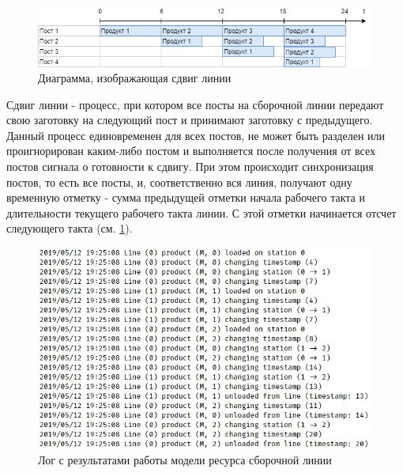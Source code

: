 \begin{figure}[h]
	\includegraphics[width=\linewidth]{pics/assemblyDiagram.png}
	\caption{Диаграмма, изображающая сдвиг линии}
	\label{fig:lineDiagram}
\end{figure}

\indent Сдвиг линии - процесс, при котором все посты на сборочной линии передают свою заготовку на следующий пост и принимают заготовку с предыдущего.
Данный процесс единовременен для всех постов, не может быть разделен или проигнорирован каким-либо постом и выполняется после получения от всех постов сигнала о готовности к сдвигу.
При этом происходит синхронизация постов, то есть все посты, и, соответственно вся линия, получают одну временную отметку - сумма предыдущей отметки начала рабочего такта и длительности текущего рабочего такта линии.
С этой отметки начинается отсчет следующего такта (см. \ref{fig:lineDiagram}).

\begin{figure}[h]
	\includegraphics[width=\linewidth]{pics/assemblyResult.png}
	\caption{Лог с результатами работы модели ресурса сборочной линии}
	\label{fig:lineResult}
\end{figure}

